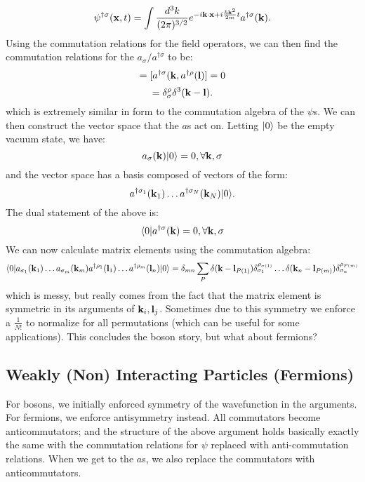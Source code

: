 \begin{equation}
    \psi^{\dagger\sigma}(\mathbf{x}, t) = \int \frac{d^3k}{(2\pi)^{3/2}}e^{-i\mathbf{k}\cdot\mathbf{x} + i\frac{\hbar\mathbf{k}^2}{2m}t}a^{\dagger\sigma}(\mathbf{k}).
\end{equation}
Using the commutation relations for the field operators, we can then find the commutation relations for the $a_\sigma/a^{\dag\sigma}$ to be:
\begin{equation}
    [a_\sigma(\v{k}), a_\rho(\v{l})] = [a^{\dag\sigma}(\v{k}, a^{\dag\rho}(\v{l})] = 0
\end{equation}
\begin{equation}
    [a_\sigma(\v{k}), a^{\dag\rho}(\v{l})] = \delta_\sigma^\rho\delta^3(\v{k} - \v{l}).
\end{equation}
which is extremely similar in form to the commutation algebra of the $\psi$s. We can then construct the vector space that the $a$s act on. Letting $\lvert 0 \rangle$ be the empty vacuum state, we have:
\begin{equation}
    a_\sigma(\mathbf{k})\lvert 0 \rangle = 0, \forall \mathbf{k}, \sigma
\end{equation}
and the vector space has a basis composed of vectors of the form:
\begin{equation}\label{eq-Fockstates}
    a^{\dagger\sigma_1}(\mathbf{k}_1)\ldots a^{\dagger\sigma_N}(\mathbf{k}_N)\lvert 0 \rangle.
\end{equation}
The dual statement of the above is:
\begin{equation}
    \langle 0 \rvert a^{\dagger\sigma}(\mathbf{k}) = 0, \forall \mathbf{k}, \sigma
\end{equation}
We can now calculate matrix elements using the commutation algebra:
\begin{equation}
    \langle 0 \rvert a_{\sigma_1}(\mathbf{k}_1)\ldots a_{\sigma_m}(\mathbf{k}_m)a^{\dagger\rho_1}(\mathbf{l}_1)\ldots a^{\dagger\rho_m}(\mathbf{l}_n)\lvert 0 \rangle = \delta_{mn}\sum_P \delta(\mathbf{k} - \mathbf{l}_{P(1)})\delta_{\sigma_1}^{\rho_{\sigma(1)}}\ldots \delta(\mathbf{k}_n - \mathbf{l}_{P(m)})\delta_{\sigma_n}^{\rho_{P(m)}}
\end{equation}
which is messy, but really comes from the fact that the matrix element is symmetric in its arguments of $\mathbf{k}_i, \mathbf{l}_j$. Sometimes due to this symmetry we enforce a $\frac{1}{N!}$ to normalize for all permutations (which can be useful for some applications). This concludes the boson story, but what about fermions?

\subsection{Weakly (Non) Interacting Particles (Fermions)}
For bosons, we initially enforced symmetry of the wavefunction in the arguments. For fermions, we enforce antisymmetry instead. All commutators become anticommutators; and the structure of the above argument holds basically exactly the same with the commutation relations for $\psi$ replaced with anti-commutation relations. When we get to the $a$s, we also replace the commutators with anticommutators.

